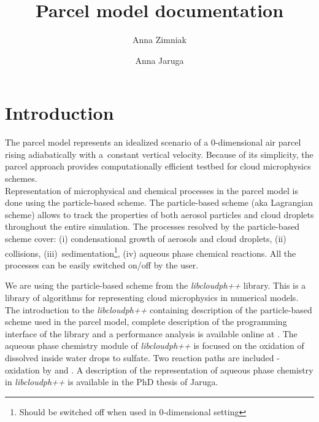 \documentclass[11pt]{article}
\author{Anna Zimniak}
\author{Anna Jaruga}
\affil{Institute of Geophysics, Faculty of Physics, University of Warsaw, Poland}
\title{Parcel model documentation}
\begin{document}
\maketitle
\vspace{-4em}


\section{Introduction}\label{sec:intro}

The parcel model represents an idealized scenario of a 0-dimensional air parcel 
  rising adiabatically with a~constant vertical velocity. 
Because of its simplicity, the parcel approach provides 
  computationally efficient testbed for cloud microphysics schemes.\\

Representation of microphysical and chemical processes in the parcel model 
  is done using the particle-based scheme.
The particle-based scheme (aka Lagrangian scheme) allows to track the properties of both 
  aerosol particles and cloud droplets throughout the entire simulation.
The processes resolved by the particle-based scheme cover:
  (i) condensational growth of aerosols and cloud droplets,
  (ii) collisions,
  (iii)~sedimentation\footnote{Should be switched off when used in 0-dimensional setting},
  (iv) aqueous phase chemical reactions.
All the processes can be easily switched on/off by the user.

We are using the particle-based scheme from the \emph{libcloudph++} library. 
This is a library of algorithms for representing cloud microphysics in numerical models.
The introduction to the \emph{libcloudph++} containing description 
  of the particle-based scheme used in the parcel model, 
  complete description of the programming interface of the library and a performance analysis
  is available online at \cite{Arabas_et_al_2015}.
The aqueous phase chemistry module of \emph{libcloudph++} is focused on the
  oxidation of  dissolved inside water drops to sulfate.
Two reaction paths are included - oxidation by  and .
A description of the representation of aqueous phase chemistry in \emph{libcloudph++} is 
  available in the PhD thesis of Jaruga.
\end{document}
